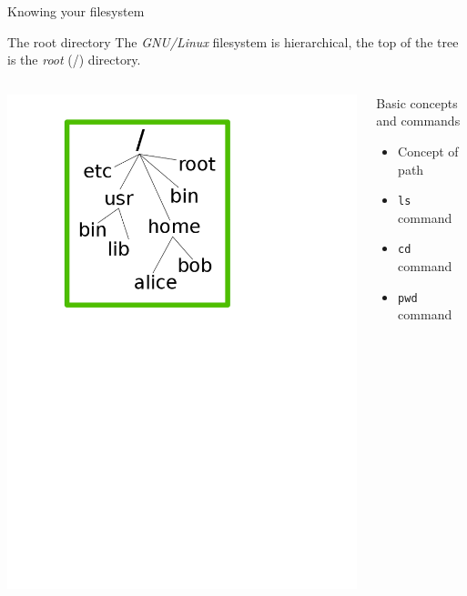   \begin{frame}{Knowing your filesystem}

    \begin{block}{The root directory}
      The \emph{GNU/Linux} filesystem is hierarchical, the top of the tree
      is the \emph{root} (\alert{/}) directory.
          \end{block}



  \vspace{-0.2cm}
  \begin{columns}[t]
    \begin{center}
      \vspace{-0.5cm}
      \includegraphics[angle=0,width=\linewidth]{./Figs/drawing.png}
    \end{center}
    \begin{block}{Basic concepts and commands}
      \begin{itemize}
      \item Concept of path
      \item \texttt{ls} command 
      \item \texttt{cd} command 
      \item \texttt{pwd} command 
      \end{itemize}
    \end{block}
  \end{columns}


\end{frame}
